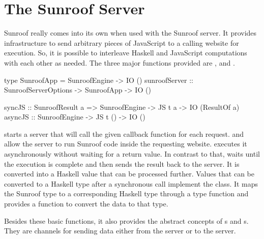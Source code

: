  
\section{The Sunroof Server}
\label{sec:server}

Sunroof really comes into its own when used with the Sunroof server.
It provides infrastructure to send arbitrary pieces 
of JavaScript to a calling website for execution. 
So, it is possible to interleave Haskell and JavaScript 
computations with each other as needed. The three major functions
provided are ,  and .
\begin{Code}
type SunroofApp = SunroofEngine -> IO ()
sunroofServer :: SunroofServerOptions -> SunroofApp -> IO ()

syncJS  :: SunroofResult a 
        => SunroofEngine -> JS t a -> IO (ResultOf a)
asyncJS :: SunroofEngine -> JS t () -> IO ()
\end{Code}
 starts a server that will call the given callback function
for each request.
 and  allow the server
to run Sunroof code inside the requesting website.
 executes it asynchronously without 
waiting for a return value. In contrast to that, 
 waits until the execution is complete and
then sends the result back to the server. It
is converted into a Haskell value that can be processed further. 
Values that can be converted to a Haskell type after a synchronous
call implement the  class. It maps the 
Sunroof type to a corresponding Haskell type through a type function 
and provides a function to convert the data to that type.

Besides these basic functions, it also provides the abstract 
concepts of s and s. They are 
channels for sending data either from the server or to
the server.

